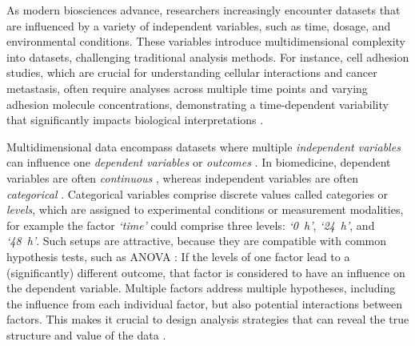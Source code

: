 

%
\label{sec:intro_multidimensional_data}%
As modern biosciences advance, researchers increasingly encounter datasets that
are influenced by a variety of independent variables, such as time, dosage, and
environmental conditions. These variables introduce multidimensional complexity
into datasets, challenging traditional analysis methods. For instance, cell
adhesion studies, which are crucial for understanding cellular interactions and
cancer metastasis, often require analyses across multiple time points and
varying adhesion molecule concentrations, demonstrating a time-dependent
variability that significantly impacts biological interpretations
\cite{reblTimedependentMetabolicActivity2010, mckayCellcellAdhesionMolecules1997,bolado-carrancioPeriodicPropagatingWaves2020a}.


Multidimensional data encompass datasets where multiple \emph{independent
    variables}  can influence one
\emph{dependent variables} or \emph{outcomes} \cite{krzywinskiMultidimensionalData2013}.
In biomedicine, dependent variables are often \emph{continuous}
, whereas independent variables are often
\emph{categorical} . Categorical variables comprise
discrete values called categories or \emph{levels}, which are assigned to
experimental conditions or measurement modalities, for example the factor
\textit{`time'} could comprise three levels: \textit{`\SI{0}{\hour}'},
\textit{`\SI{24}{\hour}'}, and \textit{`\SI{48}{\hour}'}. Such setups are
attractive, because they are compatible with common hypothesis tests, such as
ANOVA \cite{motulskyIntuitiveBiostatisticsNonmathematical2017}: If the levels of
one factor lead to a (significantly) different outcome, that factor is
considered to have an influence on the dependent variable. Multiple factors
address multiple hypotheses, including the influence from each individual
factor, but also potential interactions between factors. This makes it crucial
to design analysis strategies that can reveal the true structure and value of
the data \cite{krzywinskiMultidimensionalData2013}.


